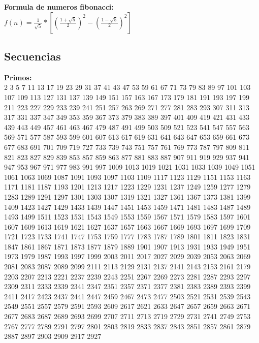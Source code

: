 \documentclass[10pt,landscape,twocolumn,a4paper,notitlepage]{article}
\begin{document}
			\vspace{8mm}
			\textbf{Formula de numeros fibonacci:}\\
			\vspace{3mm}
			{\Large $f(n) = \frac{1}{\sqrt{5}} * [ (\frac{1 + \sqrt{5}}{2})^{2}  - (\frac{1 - \sqrt{5}}{2})^{2}]$ }
			
		\newpage		
		\subsection{Secuencias}
		
		\textbf{Primos:}\\
		\vspace{3mm}
			2 3 5 7 11 13 17 19 23 29 31 37 41 43 47 53 59 61 67 71 73 79 83 89 97 101 103 107 109 113 127 131 137 139 149
			151 157 163 167 173 179 181 191 193 197 199 211 223 227 229 233 239 241 251 257 263 269 271 277 281 283 293 307
			311 313 317 331 337 347 349 353 359 367 373 379 383 389 397 401 409 419 421 431 433 439 443 449 457 461 463 467
			479 487 491 499 503 509 521 523 541 547 557 563 569 571 577 587 593 599 601 607 613 617 619 631 641 643 647 653
			659 661 673 677 683 691 701 709 719 727 733 739 743 751 757 761 769 773 787 797 809 811 821 823 827 829 839 853
			857 859 863 877 881 883 887 907 911 919 929 937 941 947 953 967 971 977 983 991 997 1009 1013 1019 1021 1031
			1033 1039 1049 1051 1061 1063 1069 1087 1091 1093 1097 1103 1109 1117 1123 1129 1151 1153 1163 1171 1181 1187
			1193 1201 1213 1217 1223 1229 1231 1237 1249 1259 1277 1279 1283 1289 1291 1297 1301 1303 1307 1319 1321 1327
			1361 1367 1373 1381 1399 1409 1423 1427 1429 1433 1439 1447 1451 1453 1459 1471 1481 1483 1487 1489 1493 1499
			1511 1523 1531 1543 1549 1553 1559 1567 1571 1579 1583 1597 1601 1607 1609 1613 1619 1621 1627 1637 1657 1663
			1667 1669 1693 1697 1699 1709 1721 1723 1733 1741 1747 1753 1759 1777 1783 1787 1789 1801 1811 1823 1831 1847
			1861 1867 1871 1873 1877 1879 1889 1901 1907 1913 1931 1933 1949 1951 1973 1979 1987 1993 1997 1999 2003 2011
			2017 2027 2029 2039 2053 2063 2069 2081 2083 2087 2089 2099 2111 2113 2129 2131 2137 2141 2143 2153 2161 2179
			2203 2207 2213 2221 2237 2239 2243 2251 2267 2269 2273 2281 2287 2293 2297 2309 2311 2333 2339 2341 2347 2351
			2357 2371 2377 2381 2383 2389 2393 2399 2411 2417 2423 2437 2441 2447 2459 2467 2473 2477 2503 2521 2531 2539
			2543 2549 2551 2557 2579 2591 2593 2609 2617 2621 2633 2647 2657 2659 2663 2671 2677 2683 2687 2689 2693 2699
			2707 2711 2713 2719 2729 2731 2741 2749 2753 2767 2777 2789 2791 2797 2801 2803 2819 2833 2837 2843 2851 2857
			2861 2879 2887 2897 2903 2909 2917 2927
	
\end{document}
